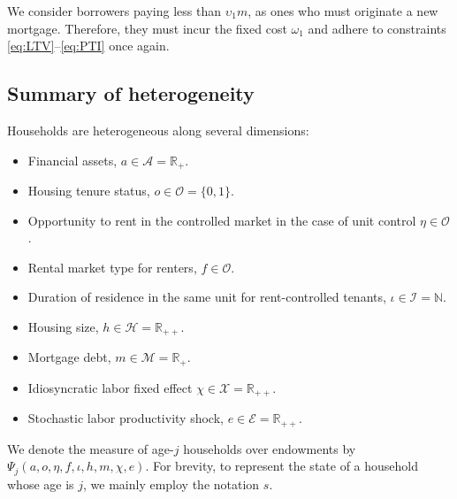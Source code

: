 \documentclass[parskip=full]{article}
\begin{document}
\noindent We consider borrowers paying less than $\upsilon_{1}m$, as ones who must originate a new mortgage. Therefore, they must incur the fixed cost $\omega_{1}$ and adhere to constraints \eqref{eq:LTV}--\eqref{eq:PTI} once again.

\subsection{Summary of heterogeneity}

Households are heterogeneous along several dimensions:

\begin{itemize}
    \item Financial assets, $a\in \mathcal{A}=\mathbb{R}_{+}$.
    \item Housing tenure status, $o \in \mathcal{O}=\{0,1\}$.
    \item Opportunity to rent in the controlled market in the case of unit control $\eta \in \mathcal{O}$.
    \item Rental market type for renters, $f \in \mathcal{O}$.
    \item Duration of residence in the same unit for rent-controlled tenants, $\iota \in \mathcal{I}=\mathbb{N}$.
    \item Housing size, $h\in \mathcal{H}=\mathbb{R}_{++}$.
    \item Mortgage debt, $m \in \mathcal{M}=\mathbb{R}_{+}$.
    \item Idiosyncratic labor fixed effect $\chi \in \mathcal{X}=\mathbb{R}_{++}$.
    \item Stochastic labor productivity shock, $e \in \mathcal{E} = \mathbb{R}_{++}$.
\end{itemize}
 
\noindent We denote the measure of age-$j$ households over endowments by $\Psi_{j}(a,o,\eta,f,\iota,h,m,\chi,e)$. For brevity, to represent the state of a household whose age is $j$, we mainly employ the notation $s$.
\end{document}
